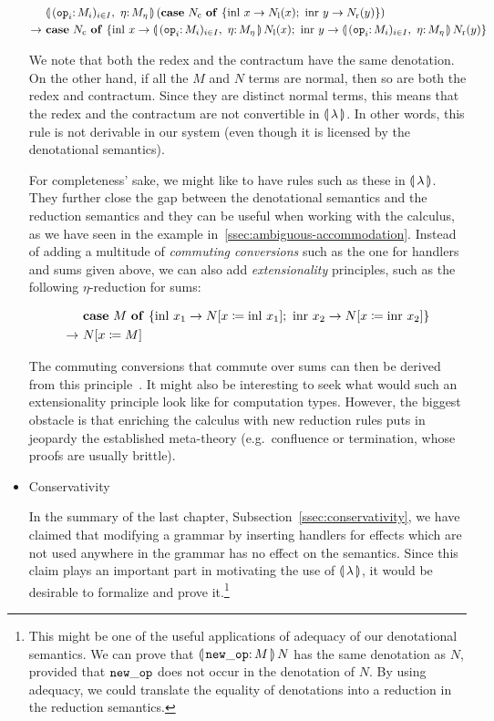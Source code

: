 \begin{itemize}
  \begin{align*}
      &\ap{\cibanana}{(\case{N_\petitc}{x}{N_\petitl(x)}{y}{N_\petitr(y)})} \\
\to \ &\case{N_\petitc}{x}{\ap{\cibanana}{N_\petitl(x)}}{y}{\ap{\cibanana}{N_\petitr(y)}}
  \end{align*}

  We note that both the redex and the contractum have the same
  denotation. On the other hand, if all the $M$ and $N$ terms are normal,
  then so are both the redex and contractum. Since they are distinct normal
  terms, this means that the redex and the contractum are not convertible
  in ${\llparenthesis \, \lambda \, \rrparenthesis}$. In other words, this rule is not derivable in our system
  (even though it is licensed by the denotational semantics).

  For completeness' sake, we might like to have rules such as these in
  ${\llparenthesis \, \lambda \, \rrparenthesis}$. They further close the gap between the denotational semantics
  and the reduction semantics and they can be useful when working with the
  calculus, as we have seen in the example
  in~\ref{ssec:ambiguous-accommodation}. Instead of adding a multitude of
  \emph{commuting conversions} such as the one for handlers and sums given
  above, we can also add \emph{extensionality} principles, such as the
  following $\eta$-reduction for sums:

  \begin{align*}
      &\text{\textbf{case} $M$ \textbf{of} $\{ \operatorname{inl}\,x_1 \to N[x \coloneqq \operatorname{inl}\,x_1];\ \operatorname{inr}\,x_2 \to N[x \coloneqq \operatorname{inr}\,x_2] \}$} \\
\to \ &N[x \coloneqq M]
  \end{align*}

  The commuting conversions that commute over sums can then be derived from
  this principle~\cite{balat2004extensional}. It might also be interesting
  to seek what would such an extensionality principle look like for
  computation types. However, the biggest obstacle is that enriching the
  calculus with new reduction rules puts in jeopardy the established
  meta-theory (e.g.\ confluence or termination, whose proofs are usually
  brittle).


\item Conservativity

  In the summary of the last chapter, Subsection~\ref{ssec:conservativity},
  we have claimed that modifying a grammar by inserting handlers for
  effects which are not used anywhere in the grammar has no effect on the
  semantics. Since this claim plays an important part in motivating the use
  of ${\llparenthesis \, \lambda \, \rrparenthesis}$, it would be desirable to formalize and prove
  it.\footnote{This might be one of the useful applications of adequacy of
    our denotational semantics. We can prove that
    $\ap{\banana{\onto{\op{new\_op}}{M}}}{N}$ has the same denotation as
    $N$, provided that $\mathtt{new\_op}$ does not occur in the denotation of
    $N$. By using adequacy, we could translate the equality of denotations
    into a reduction in the reduction semantics.}
  


\end{itemize}
